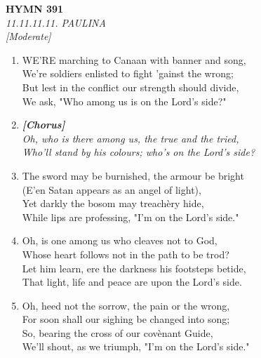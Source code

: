 \newpage
\begin{center}
    {\Large \textbf{HYMN 391}}
    \\
    \textit{11.11.11.11. PAULINA}
    \\
    \textit{\small [Moderate]}
\end{center}
\vspace{1em}

\begin{enumerate}
    \item WE'RE marching to Canaan with banner and song, \\
        We're soldiers enlisted to fight 'gainst the wrong; \\
        But lest in the conflict our strength should divide, \\
        We ask, "Who among us is on the Lord's side?"

    \item[] \vspace{0.4em}
    \textbf{\textit{[Chorus]}} \\
    \textit{Oh, who is there among us, the true and the tried,} \\
    \textit{Who'll stand by his colours; who's on the Lord's side?}
    \vspace{0.4em}

    \item The sword may be burnished, the armour be bright \\
        (E'en Satan appears as an angel of light), \\
        Yet darkly the bosom may treach\`ery hide, \\
        While lips are professing, "I'm on the Lord's side."

    \item Oh, is one among us who cleaves not to God, \\
        Whose heart follows not in the path to be trod? \\
        Let him learn, ere the darkness his footsteps betide, \\
        That light, life and peace are upon the Lord's side.

    \item Oh, heed not the sorrow, the pain or the wrong, \\
        For soon shall our sighing be changed into song; \\
        So, bearing the cross of our cov\`enant Guide, \\
        We'll shout, as we triumph, "I'm on the Lord's side."

\end{enumerate}

